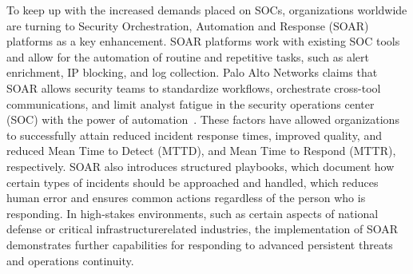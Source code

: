 To keep up with the increased demands placed on SOCs, organizations worldwide are turning to Security Orchestration, Automation and Response (SOAR) platforms as a key enhancement. SOAR platforms work with existing SOC tools and allow for the automation of routine and repetitive tasks, such as alert enrichment, IP blocking, and log collection. Palo Alto Networks claims that SOAR allows security teams to standardize workflows, orchestrate cross-tool communications, and limit analyst fatigue in the security operations center (SOC) with the power of automation~\cite{paloalto}. These factors have allowed organizations to successfully attain reduced incident response times, improved quality, and reduced Mean Time to Detect (MTTD), and Mean Time to Respond (MTTR), respectively. SOAR also introduces structured playbooks, which document how certain types of incidents should be approached and handled, which reduces human error and ensures common actions regardless of the person who is responding. In high-stakes environments, such as certain aspects of national defense or critical infrastructurerelated industries, the implementation of SOAR demonstrates further capabilities for responding to advanced persistent threats and operations continuity.
